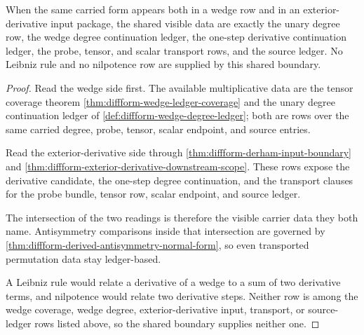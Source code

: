 \begin{theorem}
\label{thm:diffform-wedge-derivative-input-boundary}
When the same carried form appears both in a wedge row and in an
exterior-derivative input package, the shared visible data are exactly the
unary degree row, the wedge degree continuation ledger, the one-step derivative
continuation ledger, the probe, tensor, and scalar transport rows, and the
source ledger. No Leibniz rule and no nilpotence row are supplied by this
shared boundary.
\end{theorem}
\begin{proof}
Read the wedge side first. The available multiplicative data are the tensor
coverage theorem \autoref{thm:diffform-wedge-ledger-coverage} and the unary
degree continuation ledger of
\autoref{def:diffform-wedge-degree-ledger}; both are rows over the same carried
degree, probe, tensor, scalar endpoint, and source entries.

Read the exterior-derivative side through
\autoref{thm:diffform-derham-input-boundary} and
\autoref{thm:diffform-exterior-derivative-downstream-scope}. These rows expose
the derivative candidate, the one-step degree continuation, and the transport
clauses for the probe bundle, tensor row, scalar endpoint, and source ledger.

The intersection of the two readings is therefore the visible carrier data
they both name. Antisymmetry comparisons inside that intersection are governed
by \autoref{thm:diffform-derived-antisymmetry-normal-form}, so even transported
permutation data stay ledger-based.

A Leibniz rule would relate a derivative of a wedge to a sum of two derivative
terms, and nilpotence would relate two derivative steps. Neither row is among
the wedge coverage, wedge degree, exterior-derivative input, transport, or
source-ledger rows listed above, so the shared boundary supplies neither one.
\end{proof}
